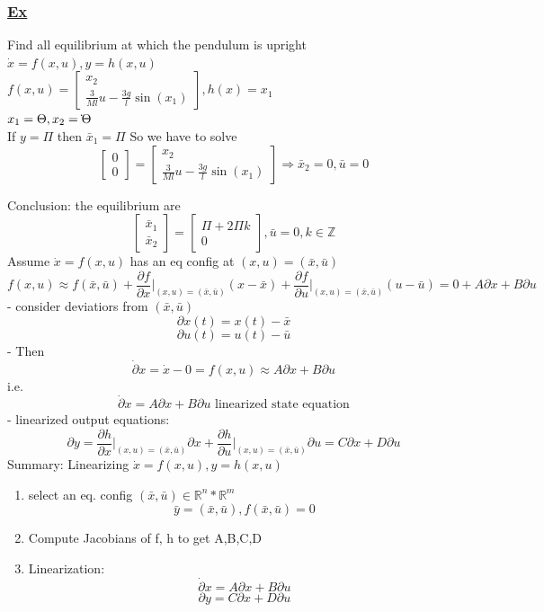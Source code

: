 \documentclass[letterpaper]{article}
\begin{document}
\subsubsection*{\underline{Ex}}
Find all equilibrium at which the pendulum is upright\\
$\dot x=f(x,u),y=h(x,u)$\\
$f(x,u)=\begin{bmatrix}x_2\\\frac{3}{Ml}u-\frac{3g}{l}\sin(x_1)\end{bmatrix},h(x)=x_1$\\
$x_1=\Theta, x_2=\dot\\ \Theta$\\
If $y=\Pi$ then $\bar x_1=\Pi$ So we have to solve $$\begin{bmatrix}0\\0\end{bmatrix}=\begin{bmatrix}x_2\\\frac{3}{Ml}u-\frac{3g}{l}\sin(x_1)\end{bmatrix}\Rightarrow \bar x_2=0, \bar u=0$$
  
Conclusion: the equilibrium are $$\begin{bmatrix}\bar x_1\\\bar x_2\end{bmatrix}=\begin{bmatrix}\Pi+2\Pi k\\0\end{bmatrix}, \bar u=0, k\in \mathbb{Z}$$
Assume $\dot x=f(x,u)$ has an eq config at $(x,u)=(\bar x, \bar u)$
$$f(x,u)\approx f(\bar x,\bar u)+\frac{\partial f}{\partial x}\vert_{(x,u)=(\bar x,\bar u)}(x-\bar x)+\frac{\partial f}{\partial u}\vert_{(x,u)=(\bar x,\bar u)}(u-\bar u)=0+A\partial x + B \partial u$$
- consider deviatiors from $(\bar x,\bar u)$ $$\partial x(t)=x(t)-\bar x$$ $$\partial u(t)=u(t)-\bar u$$
- Then $$\dot \partial x=\dot x -0=f(x,u)\approx A\partial x + B \partial u$$
i.e. \begin{equation}
\dot \partial x=A\partial x+B\partial u \text{ linearized state equation}
\end{equation}
- linearized output equations: $$\partial y=\frac{\partial h}{\partial x}\vert_{(x,u)=(\bar x,\bar u)}\partial x+\frac{\partial h}{\partial u}\vert_{(x,u)=(\bar x,\bar u)}\partial u=C\partial x+D\partial u$$
Summary: Linearizing $\dot x=f(x,u), y=h(x,u)$
\begin{enumerate}
	\item select an eq. config $(\bar x,\bar u)\in \mathbb{R}^n*\mathbb{R}^m$ $$\bar y=(\bar x,\bar u), f(\bar x,\bar u)=0$$
	\item Compute Jacobians of f, h to get A,B,C,D
	\item Linearization: $$\dot \partial x=A\partial x+B\partial u$$ $$\partial y=C\partial x+D\partial u$$
\end{enumerate}
\end{document}
